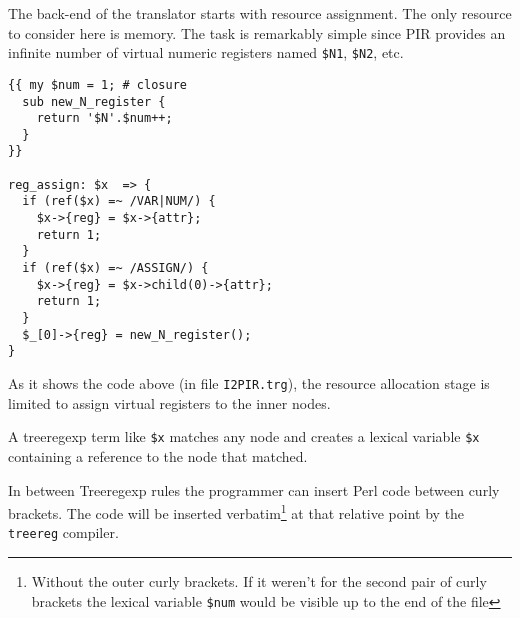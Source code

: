 The back-end of the translator starts with resource assignment.
The only resource to consider here is memory. The task is
remarkably simple since PIR provides an infinite number of virtual
numeric registers named \verb|$N1|, \verb|$N2|, etc.

\begin{verbatim}
{{ my $num = 1; # closure
  sub new_N_register {
    return '$N'.$num++;
  }
}}

reg_assign: $x  => {
  if (ref($x) =~ /VAR|NUM/) {
    $x->{reg} = $x->{attr};
    return 1;
  }
  if (ref($x) =~ /ASSIGN/) {
    $x->{reg} = $x->child(0)->{attr};
    return 1;
  }
  $_[0]->{reg} = new_N_register();
}
\end{verbatim}
As it shows the code above (in file \verb|I2PIR.trg|), 
the resource allocation stage
is limited to assign virtual registers
to the inner nodes. 

A treeregexp term like \verb|$x| matches any node
and creates a lexical variable \verb|$x|
containing a reference to the node that matched.

In between Treeregexp rules the programmer can insert 
Perl code between curly brackets. 
The code will be inserted verbatim\footnote{Without 
the outer curly brackets.
If it weren't for the second pair of curly brackets
the lexical variable {\tt \$num} would be visible
up to the end of the file
} at that relative point by the \verb|treereg|
compiler. 

